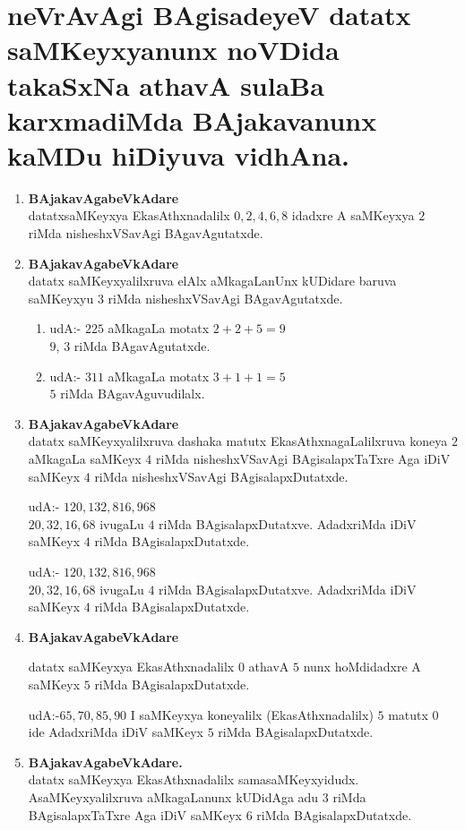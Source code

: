 \chapter{neVrAvAgi BAgisadeyeV datatx saMKeyxyanunx noVDida takaSxNa athavA sulaBa karxmadiMda BAjakavanunx kaMDu hiDiyuva vidhAna.}

\begin{enumerate}[{\rm 1)}]
\item {} \textbf{BAjakavAgabeVkAdare}\\
datatxsaMKeyxya EkasAthxnadalilx $0,2,4,6,8$ idadxre A saMKeyxya $2$ riMda \-nisheshxVSavAgi BAgavAgutatxde.

\item {} \textbf{BAjakavAgabeVkAdare}\\
datatx saMKeyxyalilxruva elAlx aMkagaLanUnx kUDidare baruva saMKeyxyu $3$ riMda nisheshxVSavAgi BAgavAgutatxde.
\begin{enumerate}[{\rm 1)}]
\item udA:- \qquad $225$ aMkagaLa motatx $2+2+5 =9$\\
\qquad $9$, \quad $3$ riMda BAgavAgutatxde.
\item udA:- \qquad $311$ aMkagaLa motatx $3+1+1 =5$\\
\qquad $5$ riMda BAgavAguvudilalx.
\end{enumerate}

\item {} \textbf{BAjakavAgabeVkAdare}\\
datatx saMKeyxyalilxruva dashaka matutx EkasAthxnagaLalilxruva koneya $2$ aMkagaLa saMKeyx $4$ riMda nisheshxVSavAgi BAgisalapxTaTxre Aga iDiV saMKeyx $4$ riMda nisheshxVSavAgi BAgisalapxDutatxde.

\quad udA:- $120,132,816,968$ \\
$20,32,16,68$ ivugaLu $4$ riMda BAgisalapxDutatxve. AdadxriMda iDiV saMKeyx $4$ riMda BAgisalapxDutatxde.

\quad udA:- $120,132,816,968$ \\
$20,32,16,68$ ivugaLu $4$ riMda BAgisalapxDutatxve. AdadxriMda iDiV saMKeyx $4$ riMda BAgisalapxDutatxde.
\item  {} \textbf{BAjakavAgabeVkAdare}

datatx saMKeyxya EkasAthxnadalilx $0$ athavA $5$ nunx hoMdidadxre A saMKeyx $5$ riMda BAgisalapxDutatxde.

\quad udA:-\quad $65,70,85,90$  I saMKeyxya koneyalilx (EkasAthxnadalilx) $5$ matutx $0$ ide AdadxriMda iDiV saMKeyx $5$ riMda BAgisalapxDutatxde.
\item {} \textbf{BAjakavAgabeVkAdare.}\\
datatx saMKeyxya EkasAthxnadalilx samasaMKeyxyidudx. AsaMKeyxyalilxruva aMkagaLanunx kUDidAga adu $3$ riMda BAgisalapxTaTxre Aga iDiV saMKeyx $6$ riMda BAgisalapxDutatxde.


\end{enumerate}
